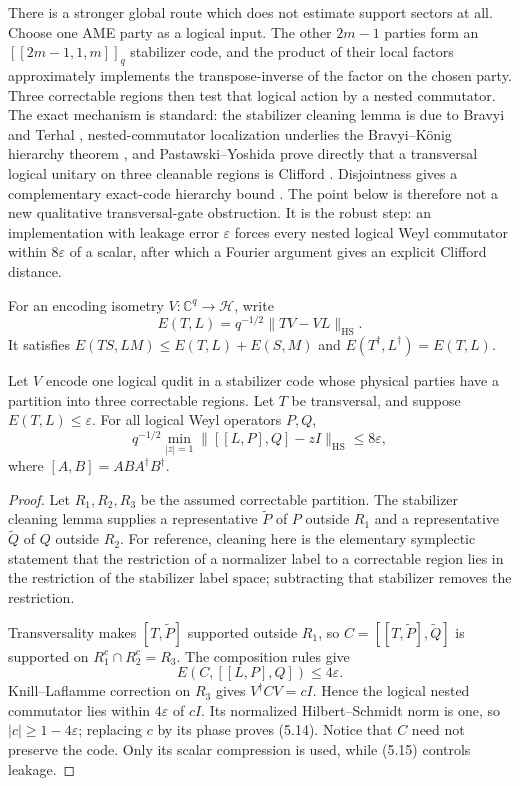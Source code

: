 There is a stronger global route which does not estimate support sectors at
all.  Choose one AME party as a logical input.  The other \(2m-1\) parties
form an \([[2m-1,1,m]]_q\) stabilizer code, and the product of their local
factors approximately implements the transpose-inverse of the factor on the
chosen party.  Three correctable regions then test that logical action by a
nested commutator.  The exact mechanism is standard: the stabilizer cleaning
lemma is due to Bravyi and Terhal
\cite[Lemma~1]{BravyiTerhal2009}, nested-commutator localization underlies the
Bravyi--K\"onig hierarchy theorem \cite{BravyiKonig2013}, and
Pastawski--Yoshida prove directly that a transversal logical unitary on three
cleanable regions is Clifford \cite[Lemma~5]{PastawskiYoshida2015}.
Disjointness gives a complementary exact-code hierarchy bound
\cite[Theorem~5]{JochymOConnorKubicaYoder2018}.  The point below is therefore
not a new qualitative transversal-gate obstruction.  It is the robust step:
an implementation with leakage error \(\varepsilon\) forces every nested
logical Weyl commutator within \(8\varepsilon\) of a scalar, after which a
Fourier argument gives an explicit Clifford distance.

For an encoding isometry \(V:\mathbb C^q\to\mathcal H\), write
\[
 E(T,L)=q^{-1/2}\lVert TV-VL\rVert_{\mathrm{HS}}.
\]
It satisfies
\(E(TS,LM)\leq E(T,L)+E(S,M)\) and
\(E(T^\dagger,L^\dagger)=E(T,L)\).

\begin{lemma}
\label{lem:quantitative-cleaning-commutator}
Let \(V\) encode one logical qudit in a stabilizer code whose physical
parties have a partition into three correctable regions.  Let \(T\) be
transversal, and suppose \(E(T,L)\leq\varepsilon\).  For all logical Weyl
operators \(P,Q\),
\[
 q^{-1/2}\min_{|z|=1}
 \lVert [[L,P],Q]-zI\rVert_{\mathrm{HS}}
 \leq8\varepsilon,                                  \tag{5.14}
\]
where \([A,B]=ABA^\dagger B^\dagger\).
\end{lemma}

\begin{proof}
Let \(R_1,R_2,R_3\) be the assumed correctable partition.  The stabilizer
cleaning lemma supplies a representative \(\widetilde P\) of \(P\) outside
\(R_1\) and a representative \(\widetilde Q\) of \(Q\) outside \(R_2\).
For reference, cleaning here is the elementary symplectic statement that
the restriction of a normalizer label to a correctable region lies in the
restriction of the stabilizer label space; subtracting that stabilizer
removes the restriction.

Transversality makes \([T,\widetilde P]\) supported outside \(R_1\), so
\(C=[[T,\widetilde P],\widetilde Q]\) is supported on
\(R_1^c\cap R_2^c=R_3\).  The composition rules give
\[
 E(C,[[L,P],Q])\leq4\varepsilon.                      \tag{5.15}
\]
Knill--Laflamme correction on \(R_3\) gives
\(V^\dagger C V=cI\).  Hence the logical nested commutator lies within
\(4\varepsilon\) of \(cI\).  Its normalized Hilbert--Schmidt norm is one,
so \(|c|\geq1-4\varepsilon\); replacing \(c\) by its phase proves (5.14).
Notice that \(C\) need not preserve the code.  Only its scalar compression
is used, while (5.15) controls leakage.
\end{proof}

